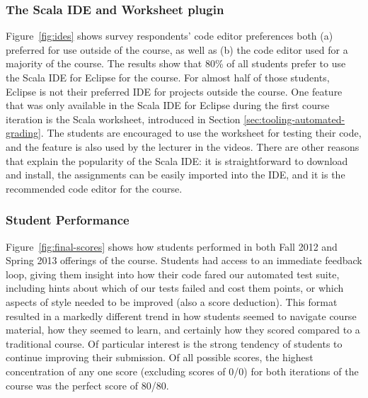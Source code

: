 \documentclass{sig-alternate}
\begin{document}



\subsubsection{The Scala IDE and Worksheet plugin}

Figure~\ref{fig:ides} shows survey respondents' code editor preferences both
(a) preferred for use outside of the course, as well as (b) the code editor used
for a majority of the course. The results show that
80\% of all students prefer to use the Scala IDE for Eclipse for the course.
For almost half of those students, Eclipse is not their preferred IDE for projects outside
the course. One feature that was only available in the Scala IDE for Eclipse
during the first course iteration is the Scala worksheet, introduced in Section
\ref{sec:tooling-automated-grading}. The students are encouraged to use the
worksheet for testing their code, and the feature is also used by the lecturer
in the videos. There are other reasons that explain the popularity of the
Scala IDE: it is straightforward to download and install, the assignments can
be easily imported into the IDE, and it is the recommended code editor for the
course.

\subsubsection{Student Performance}

Figure~\ref{fig:final-scores} shows how students performed in both Fall 2012 and Spring 2013 offerings of the course.
Students had access to an immediate feedback loop, giving them insight into how their code fared our automated test suite, including hints about which of our tests failed and cost them points, or which aspects of style needed to be improved (also a score deduction). This format resulted in a markedly different trend in how students seemed to navigate course material, how they seemed to learn, and certainly how they scored compared to a traditional course. Of particular interest is the strong tendency of students to continue improving their submission. Of all possible scores, the highest concentration of any one score (excluding scores of 0/0) for both iterations of the course was the perfect score of 80/80.
\end{document}
